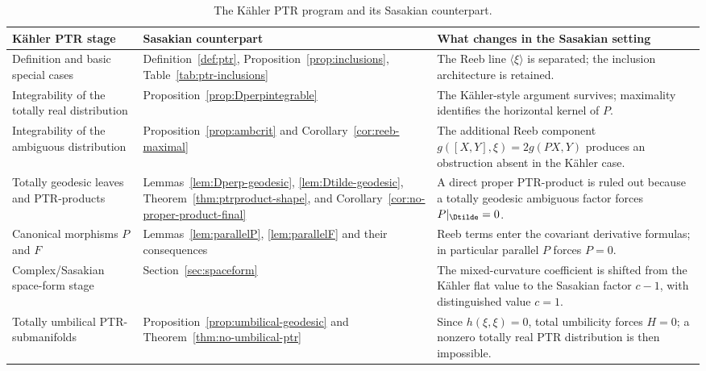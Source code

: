 \documentclass[11pt]{article}
\theoremstyle{definition}\newtheorem{definition}[theorem]{Definition}\newtheorem{example}[theorem]{Example}
\theoremstyle{remark}\newtheorem{remark}[theorem]{Remark}
\begin{document}
\begin{table}[ht]
\centering
\small
\caption{The K\"ahler PTR program and its Sasakian counterpart.}
\label{tab:kahler-sasakian-program}
\begin{tabular}{@{}>{\raggedright\arraybackslash}p{}
                >{\raggedright\arraybackslash}p{}
                >{\raggedright\arraybackslash}p{}@{}}
\toprule
K\"ahler PTR stage \cite{PoyrazSahinYerlikaya2025}
& Sasakian counterpart
& What changes in the Sasakian setting\\
\midrule
Definition and basic special cases
& Definition~\ref{def:ptr}, Proposition~\ref{prop:inclusions},
Table~\ref{tab:ptr-inclusions}
& The Reeb line \(\langle\xi\rangle\) is separated; the inclusion architecture is retained.\\
\addlinespace
Integrability of the totally real distribution
& Proposition~\ref{prop:Dperpintegrable}
& The K\"ahler-style argument survives; maximality identifies the horizontal kernel of \(P\).\\
\addlinespace
Integrability of the ambiguous distribution
& Proposition~\ref{prop:ambcrit} and Corollary~\ref{cor:reeb-maximal}
& The additional Reeb component
\(g([X,Y],\xi)=2g(PX,Y)\) produces an obstruction absent in the K\"ahler case.\\
\addlinespace
Totally geodesic leaves and PTR-products
& Lemmas~\ref{lem:Dperp-geodesic}, \ref{lem:Dtilde-geodesic},
Theorem~\ref{thm:ptrproduct-shape}, and
Corollary~\ref{cor:no-proper-product-final}
& A direct proper PTR-product is ruled out because a totally geodesic ambiguous factor forces \(P|_{\Dtilde}=0\).\\
\addlinespace
Canonical morphisms \(P\) and \(F\)
& Lemmas~\ref{lem:parallelP}, \ref{lem:parallelF} and their consequences
& Reeb terms enter the covariant derivative formulas; in particular parallel \(P\) forces \(P=0\).\\
\addlinespace
Complex/Sasakian space-form stage
& Section~\ref{sec:spaceform}
& The mixed-curvature coefficient is shifted from the K\"ahler flat value to the Sasakian factor \(c-1\), with distinguished value \(c=1\).\\
\addlinespace
Totally umbilical PTR-submanifolds
& Proposition~\ref{prop:umbilical-geodesic} and Theorem~\ref{thm:no-umbilical-ptr}
& Since \(h(\xi,\xi)=0\), total umbilicity forces \(H=0\); a nonzero totally real PTR distribution is then impossible.\\
\bottomrule
\end{tabular}
\end{table}
\end{document}
